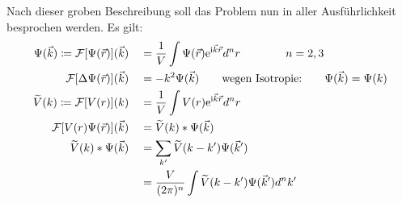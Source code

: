 Nach dieser groben Beschreibung soll das Problem nun in aller Ausführlichkeit besprochen werden. Es gilt: 
\begin{alignat*}{2}
 \Psi(\vec{k})\coloneqq \mathcal{F}[\Psi(\vec{r})](\vec{k}) && &= \frac{1}{V}\int \Psi(\vec{r})\text{e} ^{\text{i}\vec{k}\vec{r}}d^n r \qquad\qquad n=2,3 \\
 \mathcal{F}[\Delta \Psi(\vec{r})](\vec{k}) && &= -k^2\Psi(\vec{k}) \qquad \text{wegen Isotropie:}\qquad \Psi(\vec{k})=\Psi(k)\\
 \widetilde{V}(k)\coloneqq \mathcal{F}[V(r)](k) && &= \frac{1}{V}\int V(r)\text{e} ^{\text{i}\vec{k}\vec{r}}d^n r  \\
 \mathcal{F}[V(r)\Psi(\vec{r})](\vec{k}) && &=\widetilde{V}(k)*\Psi(\vec{k}) \ \\
 \widetilde{V}(k)*\Psi(\vec{k})  && &= \sum\limits_{k'}  \widetilde{V}(k-k')\Psi(\vec{k} ') \\
 && &= \frac{V}{(2\pi)^n}\int  \widetilde{V}(k-k')\Psi(\vec{k} ') d^n k'
\end{alignat*}
